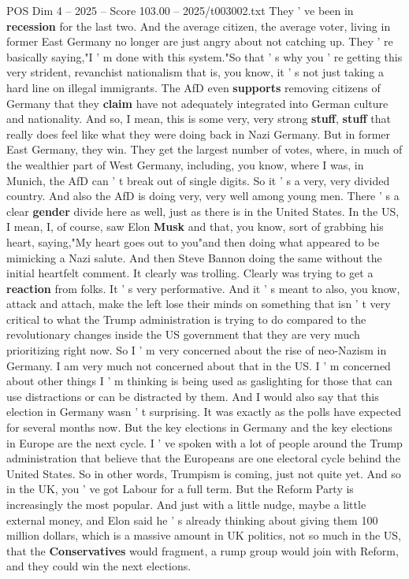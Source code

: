 \begin{textsample}{POS Dim 4 – 2025 – Score 103.00 – 2025/t003002.txt}
They ' ve been in \textbf{recession} for the last two.
And the average citizen, the average voter, living in former East Germany no longer are just angry about not catching up.
They ' re basically saying,"I ' m done with this system."So that ' s why you ' re getting this very strident, revanchist nationalism that is, you know, it ' s not just taking a hard line on illegal immigrants.
The AfD even \textbf{supports} removing citizens of Germany that they \textbf{claim} have not adequately integrated into German culture and nationality.
And so, I mean, this is some very, very strong \textbf{stuff}, \textbf{stuff} that really does feel like what they were doing back in Nazi Germany.
But in former East Germany, they win.
They get the largest number of votes, where, in much of the wealthier part of West Germany, including, you know, where I was, in Munich, the AfD can ' t break out of single digits.
So it ' s a very, very divided country.
And also the AfD is doing very, very well among young men.
There ' s a clear \textbf{gender} divide here as well, just as there is in the United States.
In the US, I mean, I, of course, saw Elon \textbf{Musk} and that, you know, sort of grabbing his heart, saying,"My heart goes out to you"and then doing what appeared to be mimicking a Nazi salute.
And then Steve Bannon doing the same without the initial heartfelt comment.
It clearly was trolling.
Clearly was trying to get a \textbf{reaction} from folks.
It ' s very performative.
And it ' s meant to also, you know, attack and attach, make the left lose their minds on something that isn ' t very critical to what the Trump administration is trying to do compared to the revolutionary changes inside the US government that they are very much prioritizing right now.
So I ' m very concerned about the rise of neo-Nazism in Germany.
I am very much not concerned about that in the US.
I ' m concerned about other things I ' m thinking is being used as gaslighting for those that can use distractions or can be distracted by them.
And I would also say that this election in Germany wasn ' t surprising.
It was exactly as the polls have expected for several months now.
But the key elections in Germany and the key elections in Europe are the next cycle.
I ' ve spoken with a lot of people around the Trump administration that believe that the Europeans are one electoral cycle behind the United States.
So in other words, Trumpism is coming, just not quite yet.
And so in the UK, you ' ve got Labour for a full term.
But the Reform Party is increasingly the most popular.
And just with a little nudge, maybe a little external money, and Elon said he ' s already thinking about giving them 100 million dollars, which is a massive amount in UK politics, not so much in the US, that the \textbf{Conservatives} would fragment, a rump group would join with Reform, and they could win the next elections.

\end{textsample}
